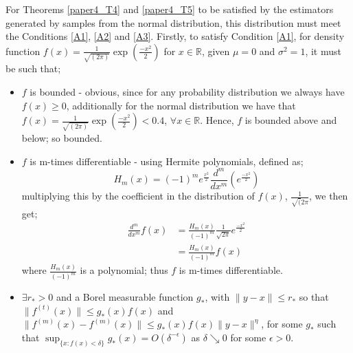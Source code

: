 \documentclass{report}
\begin{document}
For Theorems \ref{paper4_T4} and \ref{paper4_T5} to be satisfied by the estimators generated by samples from the normal distribution, this distribution must meet the Conditions \ref{A1}, \ref{A2} and \ref{A3}. 
Firstly, to satisfy Condition \ref{A1}, for density function $f(x) = \frac{1}{\sqrt{(2\pi)}} \exp{ \left( \frac{-x^2}{2} \right)}$ for $x \in \mathbb{R}$, given $\mu = 0$ and $\sigma^2 = 1$, it must be such that;
\begin{itemize}
\item $f$ is bounded - obvious, since for any probability distribution we always have $f(x) \geq 0$, additionally for the normal distribution we have that $f(x) = \frac{1}{\sqrt{(2\pi)}} \exp{ \left( \frac{-x^2}{2} \right)} < 0.4$, $\forall x \in \mathbb{R}$. Hence, $f$ is bounded above and below; so bounded.

\item $f$ is m-times differentiable - using Hermite polynomials, defined as;
\begin{equation}
H_{m}(x) = (-1)^m e^{\frac{x^2}{2}} \frac{d^m}{dx^m} \left(e^{\frac{-x^2}{2}} \right) \nonumber
\end{equation}
multiplying this by the coefficient in the distribution of $f(x)$, $\frac{1}{\sqrt(2 \pi}$, we then get;
\begin{align*}
 \frac{d^m}{dx^m} f(x) &= \frac{H_{m}(x)}{(-1)^m} \frac{1}{\sqrt{2 \pi}} e^{\frac{-x^2}{2}} \\ 
&= \frac{H_{m}(x)}{(-1)^m} f(x) 
\end{align*}
where $\frac{H_{m}(x)}{(-1)^m}$ is a polynomial; thus $f$ is m-times differentiable.

\item $\exists r_{*} > 0$ and a Borel measurable function $g_{*}$, with $\|y-x\| \leq r_{*}$ so that $\|f^{(t)}(x)\| \leq g_{*}(x) f(x)$ and $\|f^{(m)}(x) - f^{(m)}(x)\| \leq g_{*}(x) f(x)\|y - x\|^{\eta}$, for some $g_{*}$ such that $\sup_{\{x : f(x) < \delta\}} g_{*}(x) = O(\delta^{-\epsilon})$ as $\delta \searrow 0$ for some $\epsilon >0$. 


\end{itemize}
\end{document}
